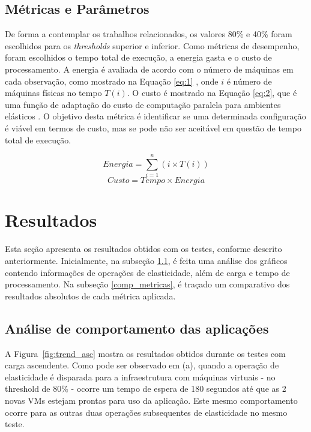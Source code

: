 \documentclass[twoside,english,brazilian]{UNISINOSartigo}
\begin{document}
\subsection{Métricas e Parâmetros}

De forma a contemplar os trabalhos relacionados, os valores 80\% e 40\% foram escolhidos para os \textit{thresholds} superior e inferior. Como métricas de desempenho, foram escolhidos o tempo total de execução, a energia gasta e o custo de processamento. A energia é avaliada de acordo com o número de máquinas em cada observação, como mostrado na Equação \ref{eq:1} , onde \(i\) é número de máquinas físicas no tempo \(T(i)\).  O custo é mostrado na Equação \ref{eq:2}, que é uma função de adaptação do custo de computação paralela para ambientes elásticos \cite{Barry2004}. O objetivo desta métrica é identificar se uma determinada configuração é viável em termos de custo, mas se pode não ser aceitável em questão de tempo total de execução. 

\begin{equation}
\label{eq:1}
Energia = \sum_{i=1}^{n}{(i \times T(i))}
\end{equation}
\begin{equation}
\label{eq:2}
Custo = Tempo \times Energia
\end{equation}

\section{Resultados}
\label{avaliacao}

Esta seção apresenta os resultados obtidos com os testes, conforme descrito anteriormente. Inicialmente, na subseção \ref{analise_comp}, é feita uma análise dos gráficos contendo informações de operações de elasticidade, além de carga e tempo de processamento. Na subseção \ref{comp_metricas}, é traçado um comparativo dos resultados absolutos de cada métrica aplicada. 

\subsection{Análise de comportamento das aplicações}
\label{analise_comp}
A Figura~\ref{fig:trend_asc} mostra os resultados obtidos durante os testes com carga ascendente. Como pode ser observado em (a), quando a operação de elasticidade é disparada para a infraestrutura com máquinas virtuais - no threshold de 80\% - ocorre um tempo de espera de 180 segundos até que as 2 novas VMs estejam prontas para uso da aplicação. Este mesmo comportamento ocorre para as outras duas operações subsequentes de elasticidade no mesmo teste.
\end{document}
